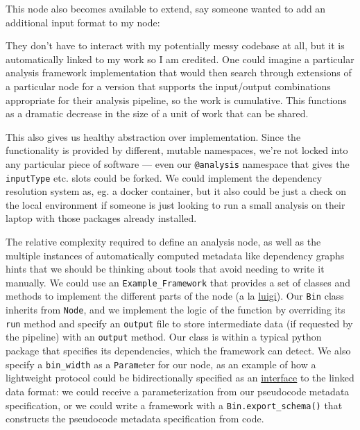 This node also becomes available to extend, say someone wanted to add an
additional input format to my node:

\begin{Shaded}
\begin{Highlighting}[]


\end{Highlighting}
\end{Shaded}

They don't have to interact with my potentially messy codebase at all,
but it is automatically linked to my work so I am credited. One could
imagine a particular analysis framework implementation that would then
search through extensions of a particular node for a version that
supports the input/output combinations appropriate for their analysis
pipeline, so the work is cumulative. This functions as a dramatic
decrease in the size of a unit of work that can be shared.

This also gives us healthy abstraction over implementation. Since the
functionality is provided by different, mutable namespaces, we're not
locked into any particular piece of software --- even our
\texttt{@analysis} namespace that gives the \texttt{inputType} etc.
slots could be forked. We could implement the dependency resolution
system as, eg. a docker container, but it also could be just a check on
the local environment if someone is just looking to run a small analysis
on their laptop with those packages already installed.

The relative complexity required to define an analysis node, as well as
the multiple instances of automatically computed metadata like
dependency graphs hints that we should be thinking about tools that
avoid needing to write it manually. We could use an
\texttt{Example\_Framework} that provides a set of classes and methods
to implement the different parts of the node (a la
\href{https://luigi.readthedocs.io/en/stable/tasks.html}{luigi}). Our
\texttt{Bin} class inherits from \texttt{Node}, and we implement the
logic of the function by overriding its \texttt{run} method and specify
an \texttt{output} file to store intermediate data (if requested by the
pipeline) with an \texttt{output} method. Our class is within a typical
python package that specifies its dependencies, which the framework can
detect. We also specify a \texttt{bin\_width} as a \texttt{Param}eter
for our node, as an example of how a lightweight protocol could be
bidirectionally specified as an
\protect\hyperlink{shared-knowledge}{interface} to the linked data
format: we could receive a parameterization from our pseudocode metadata
specification, or we could write a framework with a
\texttt{Bin.export\_schema()} that constructs the pseudocode metadata
specification from code.

